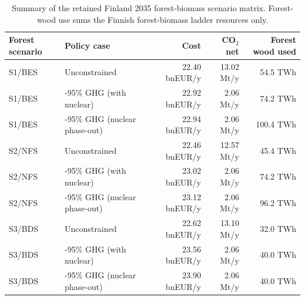 \documentclass{article}
\begin{document}
\begin{table}[H]
  \centering
  \small
  \renewcommand{\arraystretch}{1.08}
  \begin{tabularx}{\linewidth}{llrrr}
    \toprule
    \textbf{Forest scenario} & \textbf{Policy case} & \textbf{Cost} & \textbf{CO$_2$ net} & \textbf{Forest wood used} \\
    \midrule
    S1/BES & Unconstrained & 22.40 bnEUR/y & 13.02 Mt/y & 54.5 TWh \\
    S1/BES & -95\% GHG (with nuclear) & 22.92 bnEUR/y & 2.06 Mt/y & 74.2 TWh \\
    S1/BES & -95\% GHG (nuclear phase-out) & 22.94 bnEUR/y & 2.06 Mt/y & 100.4 TWh \\
    S2/NFS & Unconstrained & 22.46 bnEUR/y & 12.57 Mt/y & 45.4 TWh \\
    S2/NFS & -95\% GHG (with nuclear) & 23.02 bnEUR/y & 2.06 Mt/y & 74.2 TWh \\
    S2/NFS & -95\% GHG (nuclear phase-out) & 23.12 bnEUR/y & 2.06 Mt/y & 96.2 TWh \\
    S3/BDS & Unconstrained & 22.62 bnEUR/y & 13.10 Mt/y & 32.0 TWh \\
    S3/BDS & -95\% GHG (with nuclear) & 23.56 bnEUR/y & 2.06 Mt/y & 40.0 TWh \\
    S3/BDS & -95\% GHG (nuclear phase-out) & 23.90 bnEUR/y & 2.06 Mt/y & 40.0 TWh \\
    \bottomrule
  \end{tabularx}
  \caption{Summary of the retained Finland 2035 forest-biomass scenario matrix. Forest-wood use sums the Finnish forest-biomass ladder resources only.}
  \label{tab:fi_2035_matrix}
\end{table}
\end{document}
